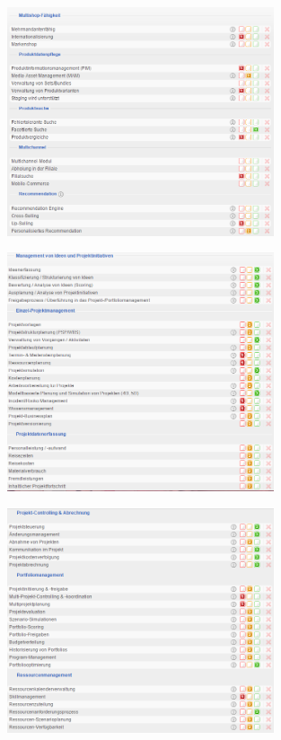 \documentclass[12pt]{article}
\begin{document}
\noindent
\begin{figure}[!h]
\centering
\includegraphics[width=0.7\textwidth]{images/tr14}
\end{figure}\FloatBarrier
\noindent
\begin{figure}[!h]
\centering
\includegraphics[width=0.7\textwidth]{images/tr15}
\end{figure}\FloatBarrier
\noindent
\begin{figure}[!h]
\centering
\includegraphics[width=0.7\textwidth]{images/tr16}
\end{figure}\FloatBarrier
\end{document}
